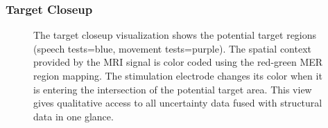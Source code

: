 \documentclass[review]{vgtc}                 %
\begin{document}

\subsubsection{Target Closeup}\label{sec:overview:placement:targetareaview}
\begin{figure}[t]
  \centering
  \caption{The target closeup visualization shows the potential target regions (speech tests=blue, movement tests=purple). The spatial context provided by the MRI signal is color coded using the red-green MER region mapping. The stimulation electrode changes its color when it is entering the intersection of the potential target area. This view gives qualitative access to all uncertainty data fused with structural data in one glance.}
  \label{fig:targetregion}
\end{figure}
\end{document}
